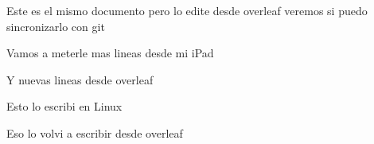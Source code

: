 \documentclass{article}
\begin{document}
	Este  es el mismo documento pero lo edite desde overleaf veremos si  puedo sincronizarlo con git
	
Vamos a meterle mas lineas desde mi iPad

Y nuevas lineas desde overleaf

Esto lo escribi en Linux


Eso lo volvi a escribir desde overleaf

 
\end{document}
